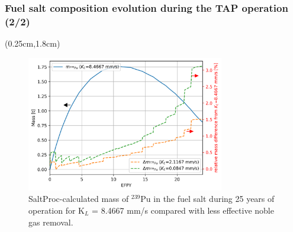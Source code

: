 \begin{frame}
\frametitle{Fuel salt composition evolution during the TAP operation (2/2)}
\begin{textblock*}{12.25cm}(0.25cm,1.8cm) %
	\begin{figure}[htp!] %
		\centering
		\includegraphics[width=0.77\textwidth]{../dissertation/figures/ch4/eps/pu239.png}
		\vspace{-1mm}
		\caption{SaltProc-calculated mass of $^{239}$Pu in the fuel salt 
		during 25 years of operation for K$_L$ = 8.4667 mm/s compared with 
		less effective noble gas removal.}
	\end{figure}
\end{textblock*}
\end{frame}



